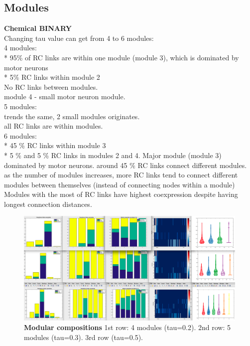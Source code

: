 \documentclass[10pt,letterpaper]{article}
\begin{document}
\subsection*{Modules}
\textbf{Chemical BINARY}\\
Changing tau value can get from 4 to 6 modules:\\
4 modules: \\
* 95\% of RC links are within one module (module 3), which is dominated by motor neurons \\
* 5\% RC links within module 2 \\
No RC links between modules. \\
module 4 - small motor neuron module. \\

5 modules: \\
trends the same, 2 small modules originates. \\
all RC links are within modules. \\

6 modules:\\
* 45 \% RC links within module 3\\
* 5 \% and 5 \% RC links in modules 2 and 4.
Major module (module 3) dominated by motor neurons.
around 45 \% RC links connect different modules. \\
as the number of modules increases, more RC links tend to connect different modules between themselves (instead of connecting nodes within a module) \\
Modules with the most of RC links have highest coexpression despite having longest connection distances.

\begin{figure}[!h]
\centering
    \includegraphics[width=1\textwidth]{modules}
 \caption{{\bf Modular compositions}
1st row: 4 modules (tau=0.2). 2nd row: 5 modules (tau=0.3). 3rd row (tau=0.5). }
 \label{Modules}
 \end{figure}
\end{document}
